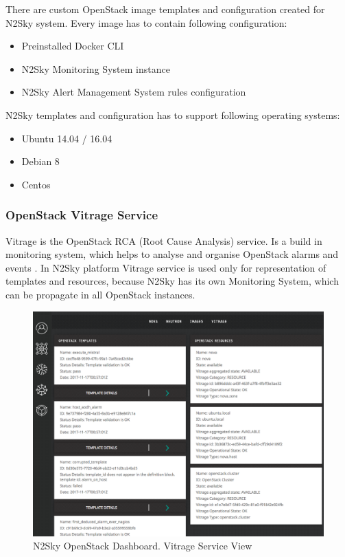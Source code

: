 There are custom OpenStack image templates and configuration created for N2Sky system. Every image has to contain following configuration:
\begin{itemize}
\item Preinstalled Docker CLI
\item N2Sky Monitoring System instance
\item N2Sky Alert Management System rules configuration
\end{itemize}

N2Sky templates and configuration has to support following operating systems:
\begin{itemize}
\item Ubuntu 14.04 / 16.04 
\item Debian 8
\item Centos
\end{itemize}



\subsubsection{OpenStack Vitrage Service}\label{OpenStack Vitrage Service}

Vitrage is the OpenStack RCA (Root Cause Analysis) service. Is a build in monitoring system, which helps to analyse and organise OpenStack alarms and events \cite{wiki:vitrage}. In N2Sky platform Vitrage service is used only for representation of  templates and resources, because N2Sky has its own Monitoring System, which can be propagate in all OpenStack instances.  

\begin{figure}[htbp]
\begin{center}
  \includegraphics[width=\linewidth]{components/4/pics/opentack_vitrage.png}
  \caption{N2Sky OpenStack Dashboard. Vitrage Service View}
  \label{fig:opentack_vitrage}
\end{center}
\end{figure}

